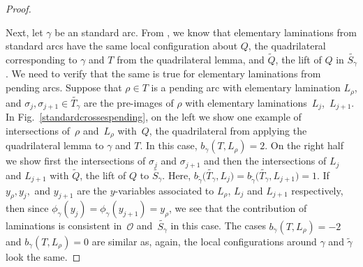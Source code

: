 \documentclass[11pt]{article}
\numberwithin{equation}{section}
\begin{document}
\begin{proof}
\begin{center}
\end{center}

 Next, let $\gamma$ be an standard arc. From \cite{MSW}, we know that elementary laminations from standard arcs have the same local configuration about $Q$, the quadrilateral corresponding to $\gamma$ and $T$ from the quadrilateral lemma, and $\widetilde{Q}$, the lift of $Q$ in $\widetilde{S_\gamma}$. We need to verify that the same is true for elementary laminations from pending arcs. Suppose that $\rho \in T$ is a pending arc with elementary lamination $L_\rho$, and $\sigma_j, \sigma_{j+1} \in \widetilde{T_\gamma}$ are the pre-images of $\rho$ with elementary laminations~$L_j$,~$L_{j+1}$. In Fig.~\ref{standardcrossespending}, on the left we show one example of intersections of~$\rho$ and~$L_\rho$ with~$Q$, the quadrilateral from applying the quadrilateral lemma to $\gamma$ and $T$. In this case, $b_\gamma(T, L_\rho) = 2$. On the right half we show first the intersections of $\sigma_j$ and $\sigma_{j+1}$ and then the intersections of $L_j$ and $L_{j+1}$ with $\widetilde{Q}$, the lift of $Q$ to $\widetilde{S_\gamma}$. Here, $b_{\widetilde{\gamma}}\big(\widetilde{T_\gamma}, L_j\big) = b_{\widetilde{\gamma}}\big(\widetilde{T_\gamma}, L_{j+1}\big) = 1$. If $y_\rho, y_j,$ and $ y_{j+1}$ are the $y$-variables associated to $L_\rho$, $L_j$ and $L_{j+1}$ respectively, then since $\phi_\gamma(y_j) = \phi_\gamma(y_{j+1}) = y_\rho$, we see that the contribution of laminations is consistent in~$\mathcal{O}$ and~$\widetilde{S_\gamma}$ in this case. The cases $b_\gamma(T, L_\rho) = -2$ and $b_\gamma(T, L_\rho) =0 $ are similar as, again, the local configurations around $\gamma$ and $\widetilde{\gamma}$ look the same.
\end{proof}
\end{document}
